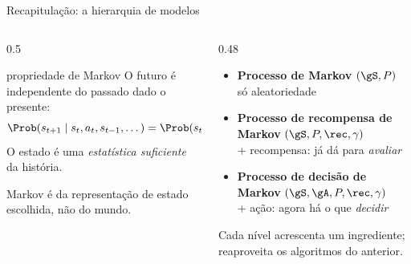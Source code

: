 \documentclass[aspectratio=169, 11pt]{beamer}
\begin{document}
\begin{frame}{Recapitulação: a hierarquia de modelos}
  \begin{columns}[T]
    \begin{column}{0.5\textwidth}
      \begin{defbox}{propriedade de Markov}
        O futuro é independente do passado dado o presente:
        \[
          \Prob(s_{t+1} \mid s_t, a_t, s_{t-1}, \dots) = \Prob(s_{t+1} \mid s_t, a_t).
        \]
        O estado é uma \emph{estatística suficiente} da história.
      \end{defbox}
      \begin{alertabox}
        Markov é da \alert{representação de estado} escolhida, não do mundo.
      \end{alertabox}
    \end{column}
    \begin{column}{0.48\textwidth}
      \begin{itemize}\setlength{\itemsep}{0.7ex}
        \item \textbf{Processo de Markov} $(\gS, P)$ \\
              {\small só aleatoriedade}
        \item \textbf{Processo de recompensa de Markov} $(\gS, P, \rec, \gamma)$ \\
              {\small \alert{+ recompensa}: já dá para \emph{avaliar}}
        \item \textbf{Processo de decisão de Markov} $(\gS, \gA, P, \rec, \gamma)$ \\
              {\small \alert{+ ação}: agora há o que \emph{decidir}}
      \end{itemize}
      \vspace{0.5em}
      \begin{ideiabox}
        Cada nível acrescenta um ingrediente; reaproveita os algoritmos do anterior.
      \end{ideiabox}
    \end{column}
  \end{columns}
\end{frame}
\end{document}
